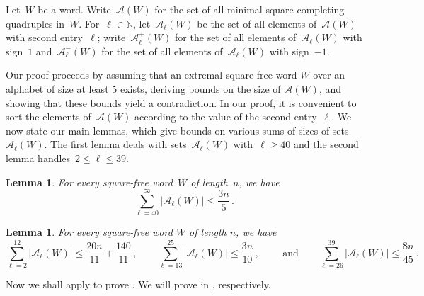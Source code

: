 \documentclass[12pt]{article}
\theoremstyle{plain}
\newtheorem{lemma}[theorem]{Lemma}
\theoremstyle{definition}
\newcommand\N{\mathbb{N}}
\newcommand{\cA}{\mathcal A}
\newcommand{\abs}[1]{\mathopen{}\left\lvert#1\right\rvert\mathclose{}}
\begin{document}
	Let~$W$ be a word. Write~$\cA(W)$ for the set of all minimal square-completing quadruples in~$W$. For~$\ell\in\N$, let~$\cA_\ell(W)$ be the set of all elements of~$\cA(W)$ with second entry~$\ell$; write~$\cA^{+}_\ell(W)$ for the set of all elements of~$\cA_\ell(W)$ with sign~$1$ and~$\cA^{-}_\ell(W)$ for the set of all elements of~$\cA_\ell(W)$ with sign~$-1$. 
	
	Our proof proceeds by assuming that an extremal square-free word $W$ over an alphabet of size at least 5 exists, deriving bounds on the size of $\cA(W)$, and showing that these bounds yield a contradiction. In our proof, it is convenient to sort the elements of~$\cA(W)$ according to the value of the second entry~$\ell$. We now state our main lemmas, which give bounds on various sums of sizes of sets~$\cA_{\ell}(W)$. The first lemma deals with sets~$\cA_{\ell}(W)$ with~$\ell\ge40$ and the second lemma handles~$2\le\ell\le39$.
	
	\begin{lemma}\label{lem:bound-40-infty}
		For every square-free word~$W$ of length~$n$, we have
		\[\sum_{\ell=40}^\infty\abs{\cA_\ell(W)}\le \frac{3n}{5}\,.\]
	\end{lemma}
	
	\begin{lemma}\label{lem:bounds-2-13-26-39}
		For every square-free word $W$ of length $n$, we have
		\[\sum_{\ell=2}^{12}\abs{\cA_{\ell}(W)}\le \frac{20n}{11}+\frac{140}{11}\,, \qquad \sum_{\ell=13}^{25}\abs{\cA_{\ell}(W)}\le \frac{3n}{10}\,,\qquad \textrm{ and} \qquad \sum_{\ell=26}^{39}\abs{\cA_{\ell}(W)} \le \frac{8n}{45}\,.\]
	\end{lemma}
	
	Now we shall apply  to prove . We will prove  in , respectively.
	
\end{document}
